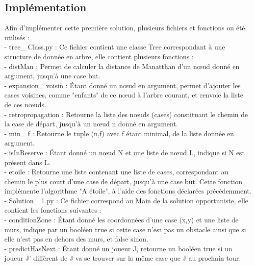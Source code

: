 \documentclass{article}
\begin{document}
	
	\subsection{Implémentation}

Afin d'implémenter cette première solution, plusieurs fichiers et fonctions on été utilisés :\\

- tree\_ Class.py : Ce fichier contient une classe Tree correspondant à une structure de donnée en arbre, elle contient plusieurs fonctions :\\ 
	
- distMan : Permet de calculer la distance de Manatthan d'un nœud donné en argument, jusqu'à une case but.\\ 
	
- expansion\_ voisin : Étant donné un nœud en argument, permet d'ajouter les cases voisines, comme "enfants" de ce nœud à l'arbre courant, et renvoie la liste de ces nœuds.\\ 
	
- retropropagation : Retourne la liste des nœuds (cases) constituant le chemin de la case de départ, jusqu'à un nœud n donné en argument.\\ 
	
- min\_ f : Retourne le tuple (n,f) avec f étant minimal, de la liste donnée en argument.\\ 
	
- isInReserve : Étant donné un nœud N et une liste de nœud L, indique si N est présent dans L.\\ 
	
- etoile : Retourne une liste contenant une liste de cases, correspondant au chemin le plus court d'une case de départ, jusqu'à une case but.
	Cette fonction implémente l'algorithme "A étoile", à l'aide des fonctions déclarées précédemment.\\ 
	
	
- Solution\_ 1.py : Ce fichier correspond au Main de la solution opportuniste, elle contient les fonctions suivantes :\\ 

- conditionZone : Étant donné les coordonnées d'une case (x,y) et une liste de murs, indique par un booléen true si cette case n'est pas un obstacle ainsi que si elle n'est pas en dehors des murs, et false sinon. \\ 
	
-  predictHasNext : Étant donné un joueur J, retourne un booléen true si un joueur J' différent de J va se trouver sur la même case que J au prochain tour. \\
	
\end{document}
